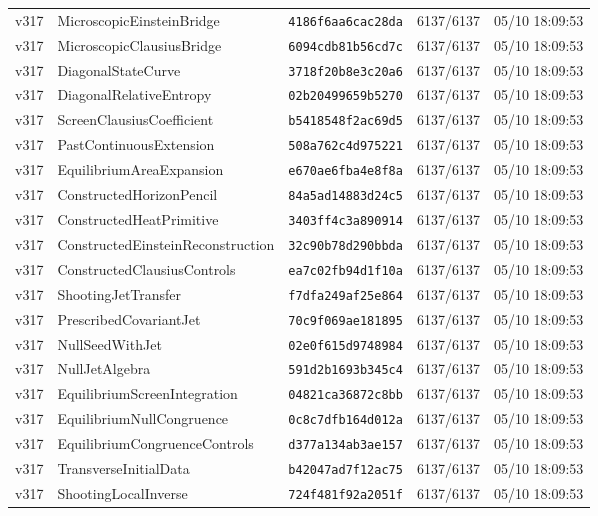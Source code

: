 \documentclass[11pt]{article}
\theoremstyle{definition}\newtheorem{deriv}{Derivation}
\begin{document}
{\begin{longtable}{@{}lllll@{}}
v317 & MicroscopicEinsteinBridge & \texttt{4186f6aa6cac28da} & 6137/6137 & 05/10 18:09:53 \\
v317 & MicroscopicClausiusBridge & \texttt{6094cdb81b56cd7c} & 6137/6137 & 05/10 18:09:53 \\
v317 & DiagonalStateCurve & \texttt{3718f20b8e3c20a6} & 6137/6137 & 05/10 18:09:53 \\
v317 & DiagonalRelativeEntropy & \texttt{02b20499659b5270} & 6137/6137 & 05/10 18:09:53 \\
v317 & ScreenClausiusCoefficient & \texttt{b5418548f2ac69d5} & 6137/6137 & 05/10 18:09:53 \\
v317 & PastContinuousExtension & \texttt{508a762c4d975221} & 6137/6137 & 05/10 18:09:53 \\
v317 & EquilibriumAreaExpansion & \texttt{e670ae6fba4e8f8a} & 6137/6137 & 05/10 18:09:53 \\
v317 & ConstructedHorizonPencil & \texttt{84a5ad14883d24c5} & 6137/6137 & 05/10 18:09:53 \\
v317 & ConstructedHeatPrimitive & \texttt{3403ff4c3a890914} & 6137/6137 & 05/10 18:09:53 \\
v317 & ConstructedEinsteinReconstruction & \texttt{32c90b78d290bbda} & 6137/6137 & 05/10 18:09:53 \\
v317 & ConstructedClausiusControls & \texttt{ea7c02fb94d1f10a} & 6137/6137 & 05/10 18:09:53 \\
v317 & ShootingJetTransfer & \texttt{f7dfa249af25e864} & 6137/6137 & 05/10 18:09:53 \\
v317 & PrescribedCovariantJet & \texttt{70c9f069ae181895} & 6137/6137 & 05/10 18:09:53 \\
v317 & NullSeedWithJet & \texttt{02e0f615d9748984} & 6137/6137 & 05/10 18:09:53 \\
v317 & NullJetAlgebra & \texttt{591d2b1693b345c4} & 6137/6137 & 05/10 18:09:53 \\
v317 & EquilibriumScreenIntegration & \texttt{04821ca36872c8bb} & 6137/6137 & 05/10 18:09:53 \\
v317 & EquilibriumNullCongruence & \texttt{0c8c7dfb164d012a} & 6137/6137 & 05/10 18:09:53 \\
v317 & EquilibriumCongruenceControls & \texttt{d377a134ab3ae157} & 6137/6137 & 05/10 18:09:53 \\
v317 & TransverseInitialData & \texttt{b42047ad7f12ac75} & 6137/6137 & 05/10 18:09:53 \\
v317 & ShootingLocalInverse & \texttt{724f481f92a2051f} & 6137/6137 & 05/10 18:09:53 \\

\end{longtable}}
\end{document}
